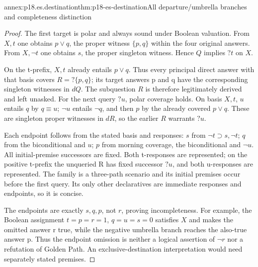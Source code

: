 \begin{annexitem}{annex:p18.es.destination}{thm:p18-es-destination}{All departure/umbrella branches and completeness distinction}
\begin{proof}
The first target is polar and always sound under Boolean valuation. From
\(X,t\) one obtains \(p\lor q\), the proper witness \(\{p,q\}\)
within the four original answers. From \(X,\neg t\) one obtains \(s\),
the proper singleton witness. Hence \(Q\) implies \(?t\) on \(X\).

On the t-prefix, \(X,t\) already entails \(p\lor q\). Thus every
principal direct answer with that basis covers \(R=?\{p,q\}\); its target
answers p and q have the corresponding singleton witnesses in \(dQ\).
The subquestion \(R\) is therefore legitimately derived and left unasked.
For the next query \(?u\), polar coverage holds. On basis \(X,t\),
\(u\) entails \(q\) by \(q\equiv u\); \(\neg u\) entails
\(\neg q\), and then \(p\) by the already covered \(p\lor q\).
These are singleton proper witnesses in \(dR\), so the earlier \(R\)
warrants \(?u\).

Each endpoint follows from the stated basis and responses: \(s\) from
\(\neg t\supset s,\neg t\); \(q\) from the biconditional and \(u\);
\(p\) from morning coverage, the biconditional and \(\neg u\).
All initial-premise successors are fixed. Both t-responses are represented;
on the positive t-prefix the unqueried R has fixed successor \(?u\), and
both u-responses are represented. The family is a three-path scenario and
its initial premises occur before the first query. Its only other declaratives
are immediate responses and endpoints, so it is concise.

The endpoints are exactly \(s,q,p\), not \(r\), proving incompleteness.
For example, the Boolean assignment \(t=p=r=1\), \(q=u=s=0\) satisfies
\(X\) and makes the omitted answer r true, while the negative umbrella
branch reaches the also-true answer p. Thus the endpoint omission is neither
a logical assertion of \(\neg r\) nor a refutation of Golden Path. An
exclusive-destination interpretation would need separately stated premises.
\end{proof}
\end{annexitem}

